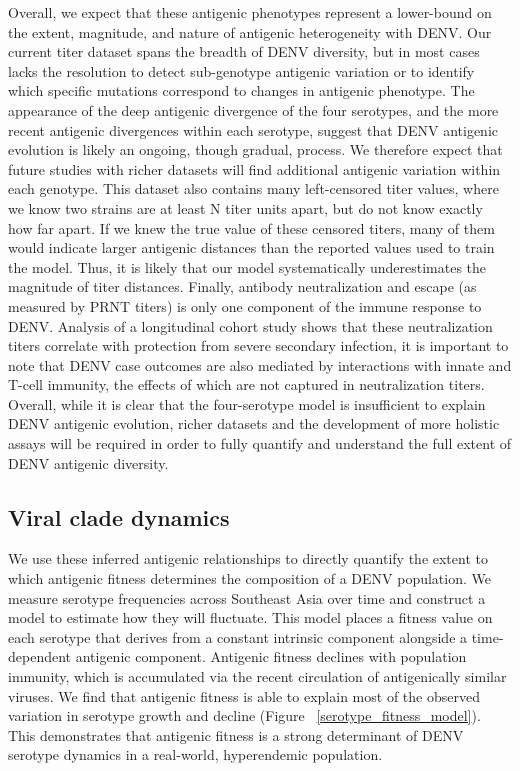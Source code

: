 \documentclass[11pt,oneside,letterpaper]{article}
\begin{document}
Overall, we expect that these antigenic phenotypes represent a lower-bound on the extent, magnitude, and nature of antigenic heterogeneity with DENV.
Our current titer dataset spans the breadth of DENV diversity, but in most cases lacks the resolution to detect sub-genotype antigenic variation or to identify which specific mutations correspond to changes in antigenic phenotype.
The appearance of the deep antigenic divergence of the four serotypes, and the more recent antigenic divergences within each serotype, suggest that DENV antigenic evolution is likely an ongoing, though gradual, process.
We therefore expect that future studies with richer datasets will find additional antigenic variation within each genotype.
This dataset also contains many left-censored titer values, where we know two strains are at least N titer units apart, but do not know exactly how far apart.
If we knew the true value of these censored titers, many of them would indicate larger antigenic distances than the reported values used to train the model.
Thus, it is likely that our model systematically underestimates the magnitude of titer distances.
Finally, antibody neutralization and escape (as measured by PRNT titers) is only one component of the immune response to DENV.
Analysis of a longitudinal cohort study shows that these neutralization titers correlate with protection from severe secondary infection, it is important to note that
DENV case outcomes are also mediated by interactions with innate and T-cell immunity, the effects of which are not captured in neutralization titers. %
Overall, while it is clear that the four-serotype model is insufficient to explain DENV antigenic evolution, richer datasets and the development of more holistic assays will be required in order to fully quantify and understand the full extent of DENV antigenic diversity.

\subsection*{Viral clade dynamics}
We use these inferred antigenic relationships to directly quantify the extent to which antigenic fitness determines the composition of a DENV population.
We measure serotype frequencies across Southeast Asia over time and construct a model to estimate how they will fluctuate.
This model places a fitness value on each serotype that derives from a constant intrinsic component alongside a time-dependent antigenic component.
Antigenic fitness declines with population immunity, which is accumulated via the recent circulation of antigenically similar viruses.
We find that antigenic fitness is able to explain most of the observed variation in serotype growth and decline (Figure ~\ref{serotype_fitness_model}).
This demonstrates that antigenic fitness is a strong determinant of DENV serotype dynamics in a real-world, hyperendemic population.
\end{document}
